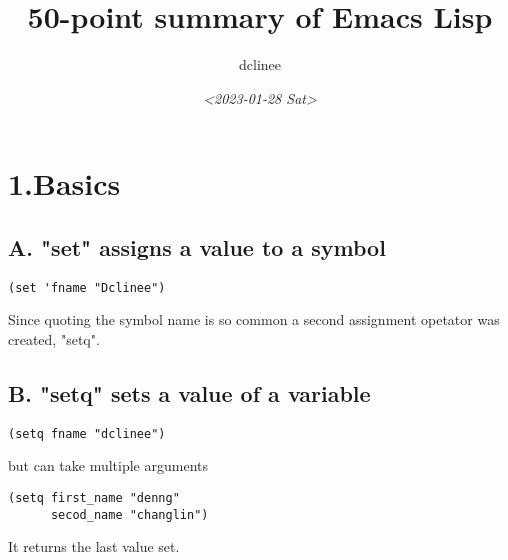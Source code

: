 \documentclass[11pt]{article}
\author{dclinee}
\date{\textit{<2023-01-28 Sat>}}
\title{50-point summary of Emacs Lisp}
\begin{document}
\maketitle
\tableofcontents

\section{1.Basics}
\label{sec:org676a3e9}
\subsection{A. "set" assigns a value to a symbol}
\label{sec:org8d4cb6e}
\begin{verbatim}
(set 'fname "Dclinee")
\end{verbatim}
Since quoting the symbol name is so common a second assignment opetator
was created, "setq".
\subsection{B. "setq" sets a value of a variable}
\label{sec:org04359fa}
\begin{verbatim}
(setq fname "dclinee")
\end{verbatim}
but can take multiple arguments
\begin{verbatim}
(setq first_name "denng"
      secod_name "changlin")
\end{verbatim}
It returns the last value set.
\end{document}
